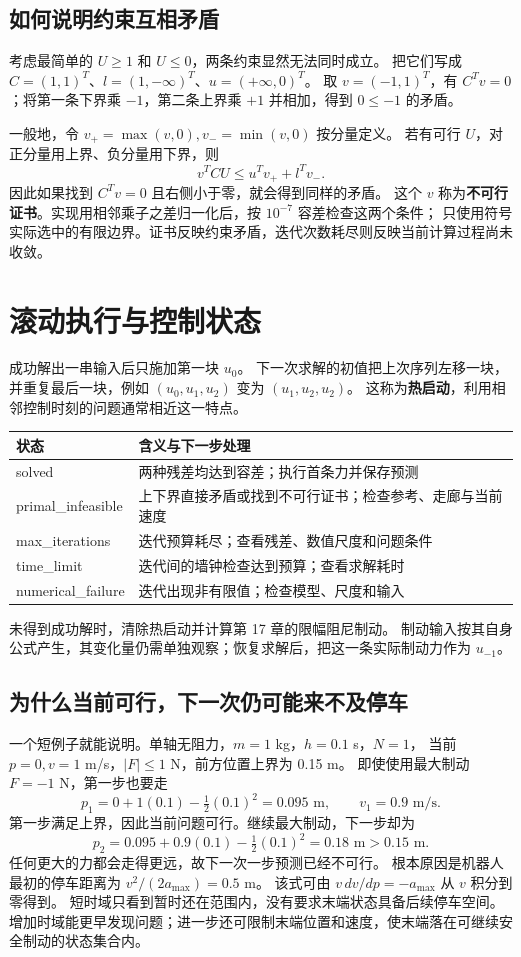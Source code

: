 \subsection{如何说明约束互相矛盾}
考虑最简单的 $U\geq1$ 和 $U\leq0$，两条约束显然无法同时成立。
把它们写成 $C=(1,1)^T$、$l=(1,-\infty)^T$、$u=(+\infty,0)^T$。
取 $v=(-1,1)^T$，有 $C^Tv=0$；将第一条下界乘 $-1$，第二条上界乘 $+1$ 并相加，得到 $0\leq-1$ 的矛盾。

一般地，令 $v_+=\max(v,0),v_-=\min(v,0)$ 按分量定义。
若有可行 $U$，对正分量用上界、负分量用下界，则
\[
 v^TCU\leq u^Tv_++l^Tv_-.
\]
因此如果找到 $C^Tv=0$ 且右侧小于零，就会得到同样的矛盾。
这个 $v$ 称为\textbf{不可行证书}。实现用相邻乘子之差归一化后，按 $10^{-7}$ 容差检查这两个条件；
只使用符号实际选中的有限边界。证书反映约束矛盾，迭代次数耗尽则反映当前计算过程尚未收敛。

\section{滚动执行与控制状态}
成功解出一串输入后只施加第一块 $u_0$。
下一次求解的初值把上次序列左移一块，并重复最后一块，例如 $(u_0,u_1,u_2)$ 变为 $(u_1,u_2,u_2)$。
这称为\textbf{热启动}，利用相邻控制时刻的问题通常相近这一特点。
\begin{center}\small
\begin{tabular}{lp{9cm}}\toprule
状态 & 含义与下一步处理\\\midrule
solved & 两种残差均达到容差；执行首条力并保存预测\\
primal\_infeasible & 上下界直接矛盾或找到不可行证书；检查参考、走廊与当前速度\\
max\_iterations & 迭代预算耗尽；查看残差、数值尺度和问题条件\\
time\_limit & 迭代间的墙钟检查达到预算；查看求解耗时\\
numerical\_failure & 迭代出现非有限值；检查模型、尺度和输入\\\bottomrule
\end{tabular}
\end{center}
未得到成功解时，清除热启动并计算第 17 章的限幅阻尼制动。
制动输入按其自身公式产生，其变化量仍需单独观察；恢复求解后，把这一条实际制动力作为 $u_{-1}$。

\subsection{为什么当前可行，下一次仍可能来不及停车}
一个短例子就能说明。单轴无阻力，$m=1$ kg，$h=0.1$ s，$N=1$，
当前 $p=0,v=1$ m/s，$|F|\leq1$ N，前方位置上界为 0.15 m。
即使使用最大制动 $F=-1$ N，第一步也要走
\[
 p_1=0+1(0.1)-\tfrac12(0.1)^2=0.095\text{ m},\qquad v_1=0.9\text{ m/s}.
\]
第一步满足上界，因此当前问题可行。继续最大制动，下一步却为
\[
 p_2=0.095+0.9(0.1)-\tfrac12(0.1)^2=0.18\text{ m}>0.15\text{ m}.
\]
任何更大的力都会走得更远，故下一次一步预测已经不可行。
根本原因是机器人最初的停车距离为 $v^2/(2a_{\max})=0.5$ m。
该式可由 $v\,dv/dp=-a_{\max}$ 从 $v$ 积分到零得到。
短时域只看到暂时还在范围内，没有要求末端状态具备后续停车空间。
增加时域能更早发现问题；进一步还可限制末端位置和速度，使末端落在可继续安全制动的状态集合内。

